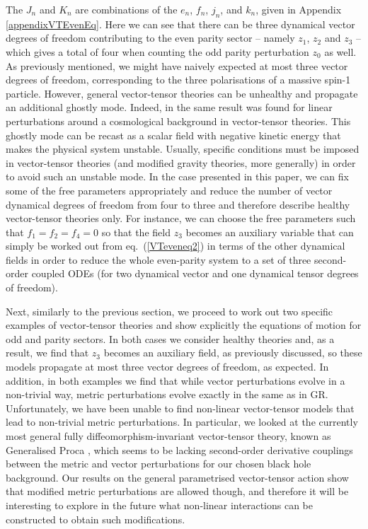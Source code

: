 \documentclass[10pt,twocolumn,preprintnumbers,amsmath,amssymb,nofootinbib
,superscriptaddress]{revtex4-1}
\begin{document}
{{{The $J_n$ and $K_n$ are combinations of the $e_n$, $f_n$, $j_n$, and $k_n$, given in Appendix \ref{appendixVTEvenEq}. Here we can see that there can be three dynamical vector degrees of freedom contributing to the even parity sector -- namely $z_1$, $z_2$ and $z_3$ -- which gives a total of four when counting the odd parity perturbation $z_0$ as well. As previously mentioned, we might have naively expected at most three vector degrees of freedom, corresponding to the three polarisations of a massive spin-1 particle. However, general vector-tensor theories can be unhealthy and propagate an additional ghostly mode. Indeed, in \cite{Lagos:2016wyv,Tattersall:2017eav} the same result was found for linear perturbations around a cosmological background in vector-tensor theories. This ghostly mode can be recast as a scalar field with negative kinetic energy that makes the physical system unstable. Usually, specific conditions must be imposed in vector-tensor theories (and modified gravity theories, more generally) in order to avoid such an unstable mode. In the case presented in this paper, we can fix some of the free parameters appropriately and reduce the number of vector dynamical degrees of freedom from four to three and therefore describe healthy vector-tensor theories only. For instance, we can choose the free parameters such that $f_1=f_2=f_4=0$ so that the field $z_3$ becomes an auxiliary variable that can simply be worked out from eq.~(\ref{VTeveneq2}) in terms of the other dynamical fields in order to reduce the whole even-parity system to a set of three second-order coupled ODEs (for two dynamical vector and one dynamical tensor degrees of freedom). 

Next, similarly to the previous section, we proceed to work out two specific examples of vector-tensor theories and show explicitly the equations of motion for odd and parity sectors. In both cases we consider healthy theories and, as a result, we find that $z_3$ becomes an auxiliary field, as previously discussed, so these models propagate at most three vector degrees of freedom, as expected. In addition, in both examples we find that while vector perturbations evolve in a non-trivial way, metric perturbations evolve exactly in the same as in GR. Unfortunately, we have been unable to find non-linear vector-tensor models that lead to non-trivial metric perturbations. In particular, we looked at the currently most general fully diffeomorphism-invariant vector-tensor theory, known as Generalised Proca \cite{2017JCAP...08..024H}, which seems to be lacking second-order derivative couplings between the metric and vector perturbations for our chosen black hole background. Our results on the general parametrised vector-tensor action show that modified metric perturbations are allowed though, and therefore it will be interesting to explore in the future what non-linear interactions can be constructed to obtain such modifications. 


}}}
\end{document}
